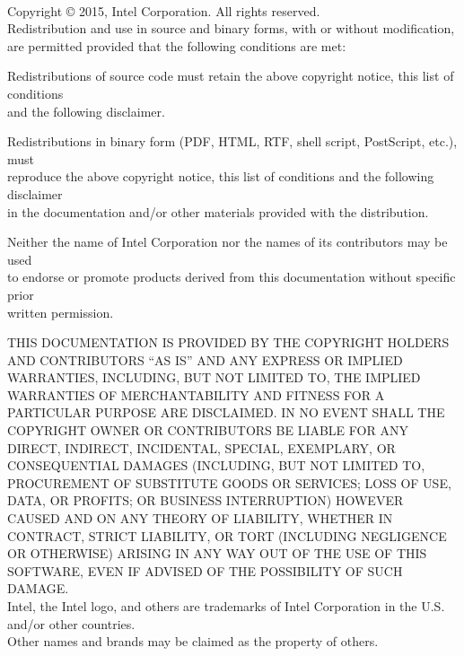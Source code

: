 
\vspace*{3.0cm}
 \\ 

\vspace*{0.5cm}

\noindent Copyright {\small\copyright} 2015, Intel Corporation. All rights reserved. \\

\noindent Redistribution and use in source and binary forms, with or without
modification, are permitted provided that the following conditions are met:

\begin{itemize*}
\item Redistributions of source code must retain the above copyright notice,
      this list of conditions \\ and the 
      following disclaimer.
\item Redistributions in binary form (PDF, HTML, RTF, shell script, PostScript,
      etc.), must \\ reproduce the above copyright notice, this list of conditions
      and the following disclaimer \\ in the documentation and/or other materials
      provided with the distribution.
\item Neither the name of Intel Corporation nor the names of its contributors
      may be used \\ to endorse or promote products derived from this
      documentation
      without specific prior \\ written permission.
\end{itemize*} 

\vspace*{0.5cm}

{\footnotesize

\noindent THIS DOCUMENTATION IS PROVIDED BY THE COPYRIGHT HOLDERS AND
CONTRIBUTORS ``AS IS'' AND ANY EXPRESS OR IMPLIED WARRANTIES, INCLUDING, BUT
NOT LIMITED TO, THE
IMPLIED WARRANTIES OF MERCHANTABILITY AND FITNESS FOR A PARTICULAR PURPOSE ARE
DISCLAIMED. IN NO EVENT SHALL THE COPYRIGHT OWNER OR CONTRIBUTORS BE LIABLE
FOR ANY DIRECT, INDIRECT, INCIDENTAL, SPECIAL, EXEMPLARY, OR CONSEQUENTIAL
DAMAGES (INCLUDING, BUT NOT LIMITED TO, PROCUREMENT OF SUBSTITUTE GOODS OR
SERVICES; LOSS OF USE, DATA, OR PROFITS; OR BUSINESS INTERRUPTION) HOWEVER
CAUSED AND ON ANY THEORY OF LIABILITY, WHETHER IN CONTRACT, STRICT LIABILITY,
OR TORT (INCLUDING NEGLIGENCE OR OTHERWISE) ARISING IN ANY WAY OUT OF THE USE
OF THIS SOFTWARE, EVEN IF ADVISED OF THE POSSIBILITY OF SUCH DAMAGE. \\

\noindent Intel, the Intel logo, and others are trademarks of Intel Corporation
in the U.S. and/or other countries. \\

\noindent *Other names and brands may be claimed as the property of others. \\



}
